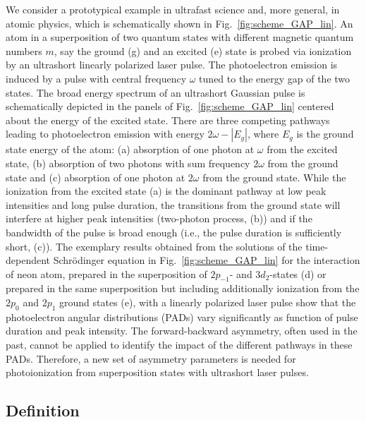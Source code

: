 We consider a prototypical example in ultrafast science and, more general, in atomic physics, which is schematically shown in Fig.~\ref{fig:scheme_GAP_lin}. 
An atom in a superposition of two quantum states with different magnetic quantum numbers $m$, say the ground (g) and an excited (e) state is probed via ionization by an ultrashort linearly polarized laser pulse. The photoelectron emission is induced by a pulse with central frequency $\omega$ tuned to the energy gap of the two states. The broad energy spectrum of an ultrashort Gaussian pulse is schematically depicted in the panels of Fig.~\ref{fig:scheme_GAP_lin} centered about the energy of the excited state. There are three competing pathways leading to photoelectron emission with energy $2\omega - |E_g|$, where $E_g$ is the ground state energy of the atom: (a) absorption of one photon at $\omega$ from the
excited state, (b) absorption of two photons with sum frequency $2\omega$ from the 
ground state and (c) absorption of one photon at $2\omega$ from the ground state. While the ionization from the excited state (a) is the dominant pathway at low peak intensities and long pulse duration, the transitions from the ground state will interfere at higher peak intensities (two-photon process, (b)) and if the bandwidth of the pulse is broad enough (i.e., the pulse duration is sufficiently short, (c)). 
The exemplary results obtained from the solutions of the time-dependent Schr\"odinger equation in Fig.\ \ref{fig:scheme_GAP_lin} for the interaction of
neon atom, prepared in the superposition of $2p_{-1}$- and $3d_2$-states (d) or prepared in the same superposition but including additionally ionization from the $2p_0$ and $2p_1$ ground states (e), with a linearly polarized laser pulse show that the photoelectron angular distributions (PADs) vary significantly as function of pulse duration and peak intensity. 
The forward-backward asymmetry, often used in the past, cannot be applied to
identify the impact of the different pathways in these PADs. Therefore, a new set of asymmetry parameters is needed for photoionization from superposition states with ultrashort laser pulses.

\subsection*{Definition}


